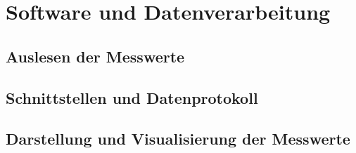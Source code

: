 \chapter{Software und Datenverarbeitung}

\section{Auslesen der Messwerte}
\section{Schnittstellen und Datenprotokoll}
\section{Darstellung und Visualisierung der Messwerte}
